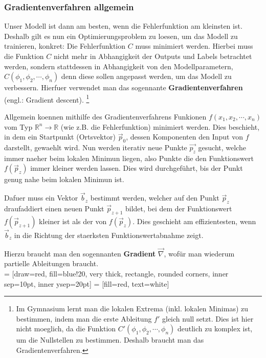 \documentclass[../main]{subfiles}
\begin{document}
\subsubsection{Gradientenverfahren allgemein}
Unser Modell ist dann am besten, wenn die Fehlerfunktion am kleinsten ist.
Deshalb gilt es nun ein Optimierungsproblem zu loesen, um das Modell zu trainieren, konkret: Die Fehlerfunktion $C$ muss minimiert werden.
Hierbei muss die Funktion $C$ nicht mehr in Abhangigkeit der Outputs und Labels betrachtet werden, sondern stattdessen in Abhangigkeit von den Modellparametern,
$C(\phi_1, \phi_2, \cdots, \phi_n)$ denn diese sollen angepasst werden, um das Modell zu verbessern.
Hierfuer verwendet man das sogennante \textbf{Gradientenverfahren} (engl.: Gradient descent).
\footnote{
    Im Gymnasium lernt man die lokalen Extrema (inkl. lokalen Minimas) zu bestimmen, indem man die erste Ableitung $f'$ gleich null setzt.
    Dies ist hier nicht moeglich, da die Funktion $C'(\phi_1,\phi_2, \cdots, \phi_n)$ deutlich zu komplex ist, um die Nullstellen zu bestimmen. Deshalb braucht man das Gradientenverfahren.
}\par
\medskip
Allgemein koennen mithilfe des Gradientenverfahrens Funkionen $f(x_1, x_2, \cdots, x_n)$ vom Typ $\mathbb{R}^n \to \mathbb{R}$ (wie z.B. die Fehlerfunktion) minimiert werden.
Dies beschieht, in dem ein Startpunkt (Ortsvektor) $\vec{p}_0$, dessen Komponenten den Input von $f$ darstellt, gewaehlt wird.
Nun werden iterativ neue Punkte $\vec{p_z}$ gesucht, welche immer naeher beim lokalen Minimun liegen, also Punkte die den Funktionswert $f(\vec{p}_z)$ immer kleiner werden lassen.
Dies wird durchgeführt, bis der Punkt genug nahe beim lokalen Minimun ist.
\par
\medskip
Dafuer muss ein Vektor $\vec{b}_z$ bestimmt werden, welcher auf den Punkt $\vec{p}_z$ draufaddiert einen neuen Punkt $\vec{p}_{z+1}$ bildet,
bei dem der Funktionswert $f(\vec{p}_{z+1})$ kleiner ist als der von $f(\vec{p}_z)$.
Dies geschieht am effizientesten, wenn $\vec{b}_z$ in die Richtung der staerksten Funktionswertabnahme zeigt.

Hierzu braucht man den sogennanten \textbf{Gradient} $\vec{\nabla}$, wofür man wiederum partielle Ableitungen braucht.\\

 = [draw=red, fill=blue!20, very thick, rectangle, rounded corners, inner sep=10pt, inner ysep=20pt]
  = [fill=red, text=white]
\end{document}
